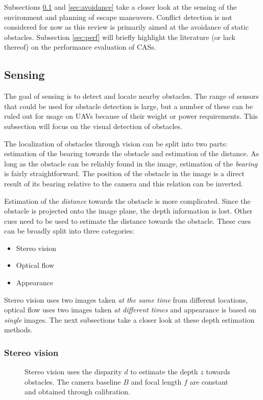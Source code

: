 Subsections \ref{sec:sensing} and \ref{sec:avoidance} take a closer look at the sensing of the environment and planning of escape maneuvers.
Conflict detection is not considered for now as this review is primarily aimed at the avoidance of static obstacles.
Subsection \ref{sec:perf} will briefly highlight the literature (or lack thereof) on the performance evaluation of \aclp{CAS}.


\subsection{Sensing}
\label{sec:sensing}
The goal of sensing is to detect and locate nearby obstacles.
The range of sensors that could be used for obstacle detection is large, but a number of these can be ruled out for usage on \acp{UAV} because of their weight or power requirements.
This subsection will focus on the visual detection of obstacles.

The localization of obstacles through vision can be split into two parts: estimation of the bearing towards the obstacle and estimation of the distance.
As long as the obstacle can be reliably found in the image, estimation of the \emph{bearing} is fairly straightforward.
The position of the obstacle in the image is a direct result of its bearing relative to the camera and this relation can be inverted.

Estimation of the \emph{distance} towards the obstacle is more complicated.
Since the obstacle is projected onto the image plane, the depth information is lost.
Other cues need to be used to estimate the distance towards the obstacle.
These cues can be broadly split into three categories:
\begin{itemize}
\item Stereo vision
\item Optical flow
\item Appearance
\end{itemize}
Stereo vision uses two images taken \emph{at the same time} from different locations, optical flow uses two images taken \emph{at different times} and appearance is based on \emph{single} images.
The next subsections take a closer look at these depth estimation methods.




\subsubsection{Stereo vision}
\begin{figure}
\centering

\caption{Stereo vision uses the disparity $d$ to estimate the depth $z$ towards obstacles. The camera baseline $B$ and focal length $f$ are constant and obtained through calibration.}
\label{fig:stereo}
\end{figure}

